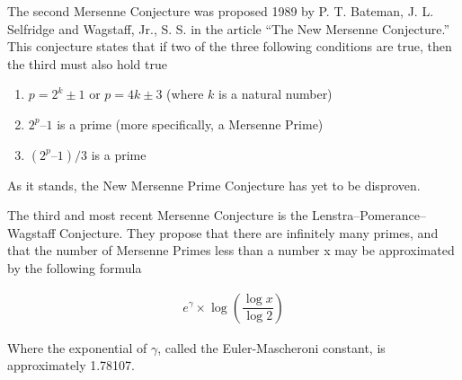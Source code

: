 The second Mersenne Conjecture was proposed 1989 by P. T. Bateman, J. L. Selfridge and
Wagstaff, Jr., S. S. in the article “The New Mersenne Conjecture.” This conjecture states that if
two of the three following conditions are true, then the third must also hold true

\begin{enumerate}
\item $p = 2^k \pm 1$ or $p = 4k \pm 3$ (where $k$ is a natural number)
\item $2^p – 1$ is a prime (more specifically, a Mersenne Prime)
\item $(2^p – 1)/3$ is a prime
\end{enumerate}

As it stands, the New Mersenne Prime Conjecture has yet to be disproven.

The third and most recent Mersenne Conjecture is the Lenstra–Pomerance–Wagstaff
Conjecture. They propose that there are infinitely many primes, and that the number of
Mersenne Primes less than a number x may be approximated by the following formula

\begin{align}
e^{\gamma} \times \log \left( \dfrac{\log{x}}{\log{2}} \right)
\end{align}

Where the exponential of $\gamma$, called the Euler-Mascheroni constant, is approximately
1.78107.
